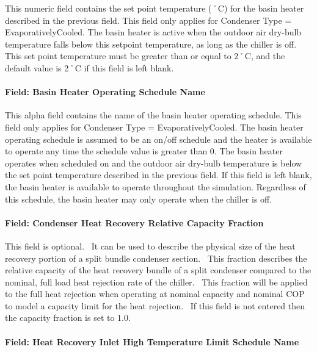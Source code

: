 This numeric field contains the set point temperature (˚C) for the basin heater described in the previous field. This field only applies for Condenser Type = EvaporativelyCooled. The basin heater is active when the outdoor air dry-bulb temperature falls below this setpoint temperature, as long as the chiller is off. This set point temperature must be greater than or equal to 2˚C, and the default value is 2˚C if this field is left blank.

\paragraph{Field: Basin Heater Operating Schedule Name}\label{field-basin-heater-operating-schedule-name-1-001}

This alpha field contains the name of the basin heater operating schedule. This field only applies for Condenser Type = EvaporativelyCooled. The basin heater operating schedule is assumed to be an on/off schedule and the heater is available to operate any time the schedule value is greater than 0. The basin heater operates when scheduled on and the outdoor air dry-bulb temperature is below the set point temperature described in the previous field. If this field is left blank, the basin heater is available to operate throughout the simulation. Regardless of this schedule, the basin heater may only operate when the chiller is off.

\paragraph{Field: Condenser Heat Recovery Relative Capacity Fraction}\label{field-condenser-heat-recovery-relative-capacity-fraction}

This field is optional.~ It can be used to describe the physical size of the heat recovery portion of a split bundle condenser section.~ This fraction describes the relative capacity of the heat recovery bundle of a split condenser compared to the nominal, full load heat rejection rate of the chiller.~ This fraction will be applied to the full heat rejection when operating at nominal capacity and nominal COP to model a capacity limit for the heat rejection.~ If this field is not entered then the capacity fraction is set to 1.0.

\paragraph{Field: Heat Recovery Inlet High Temperature Limit Schedule Name}\label{field-heat-recovery-inlet-high-temperature-limit-schedule-name}

